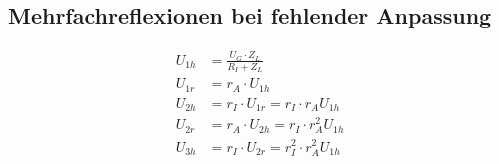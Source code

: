 \subsection{Mehrfachreflexionen bei fehlender Anpassung}


\begin{align*}
    U_{1h} & = \frac{U_G\cdot Z_L}{R_I + Z_L}            \\
    U_{1r} & = r_A\cdot U_{1h}                           \\
    U_{2h} & = r_I\cdot U_{1r} = r_I\cdot r_A U_{1h}     \\
    U_{2r} & = r_A\cdot U_{2h} = r_I\cdot r_A^2 U_{1h}   \\
    U_{3h} & = r_I\cdot U_{2r} = r_I^2\cdot r_A^2 U_{1h}
\end{align*}

